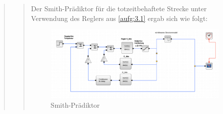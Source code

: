 \begin{quote}
    
    \begin{quote}
        
        Der Smith-Prädiktor für die totzeitbehaftete Strecke unter Verwendung des Reglers aus \ref{aufg:3.1} ergab sich wie folgt:
        
       \begin{figure}[H]
        \centering
            \includegraphics[scale=0.4, trim = 0cm 0cm 0cm 0cm, clip]{./Bilder/Smith-Praediktor}
                \caption{Smith-Prädiktor}
        \end{figure}
    
        
    \end{quote}
    
\end{quote} %




